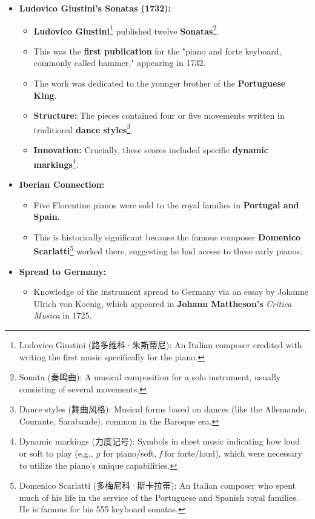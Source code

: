 \documentclass[math,code]{amznotes}
\theoremstyle{remark}
\begin{document}
\begin{itemize}
    \item \textbf{Ludovico Giustini's Sonatas (1732):}
    \begin{itemize}
        \item \textbf{Ludovico Giustini}\footnote{Ludovico Giustini (路多维科·朱斯蒂尼): An Italian composer credited with writing the first music specifically for the piano.} published twelve \textbf{Sonatas}\footnote{Sonata (奏鸣曲): A musical composition for a solo instrument, usually consisting of several movements.}.
        \item This was the \textbf{first publication} for the "piano and forte keyboard, commonly called hammer," appearing in 1732.
        \item The work was dedicated to the younger brother of the \textbf{Portuguese King}.
        \item \textbf{Structure:} The pieces contained four or five movements written in traditional \textbf{dance styles}\footnote{Dance styles (舞曲风格): Musical forms based on dances (like the Allemande, Courante, Sarabande), common in the Baroque era.}.
        \item \textbf{Innovation:} Crucially, these scores included specific \textbf{dynamic markings}\footnote{Dynamic markings (力度记号): Symbols in sheet music indicating how loud or soft to play (e.g., \textit{p} for piano/soft, \textit{f} for forte/loud), which were necessary to utilize the piano's unique capabilities.}.
    \end{itemize}
    \item \textbf{Iberian Connection:}
    \begin{itemize}
        \item Five Florentine pianos were sold to the royal families in \textbf{Portugal and Spain}.
        \item This is historically significant because the famous composer \textbf{Domenico Scarlatti}\footnote{Domenico Scarlatti (多梅尼科·斯卡拉蒂): An Italian composer who spent much of his life in the service of the Portuguese and Spanish royal families. He is famous for his 555 keyboard sonatas.} worked there, suggesting he had access to these early pianos.
    \end{itemize}
    \item \textbf{Spread to Germany:}
    \begin{itemize}
        \item Knowledge of the instrument spread to Germany via an essay by Johanne Ulrich von Koenig, which appeared in \textbf{Johann Mattheson's} \textit{Critica Musica} in 1725.

\end{itemize}
\end{itemize}
\end{document}

